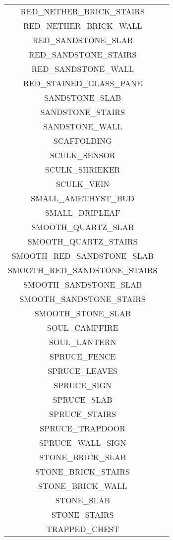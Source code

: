 \begin{longtable}{ |c|c| }
	RED\_NETHER\_BRICK\_STAIRS & \xmark \\
	RED\_NETHER\_BRICK\_WALL & \xmark \\
	RED\_SANDSTONE\_SLAB & \xmark \\
	RED\_SANDSTONE\_STAIRS & \xmark \\
	RED\_SANDSTONE\_WALL & \xmark \\
	RED\_STAINED\_GLASS\_PANE & \xmark \\
	SANDSTONE\_SLAB & \xmark \\
	SANDSTONE\_STAIRS & \xmark \\
	SANDSTONE\_WALL & \xmark \\
	SCAFFOLDING & \xmark \\
	SCULK\_SENSOR & \xmark \\
	SCULK\_SHRIEKER & \xmark \\
	SCULK\_VEIN & \xmark \\
	SMALL\_AMETHYST\_BUD & \xmark \\
	SMALL\_DRIPLEAF & \xmark \\
	SMOOTH\_QUARTZ\_SLAB & \xmark \\
	SMOOTH\_QUARTZ\_STAIRS & \xmark \\
	SMOOTH\_RED\_SANDSTONE\_SLAB & \xmark \\
	SMOOTH\_RED\_SANDSTONE\_STAIRS & \xmark \\
	SMOOTH\_SANDSTONE\_SLAB & \xmark \\
	SMOOTH\_SANDSTONE\_STAIRS & \xmark \\
	SMOOTH\_STONE\_SLAB & \xmark \\
	SOUL\_CAMPFIRE & \xmark \\
	SOUL\_LANTERN & \xmark \\
	SPRUCE\_FENCE & \xmark \\
	SPRUCE\_LEAVES & \xmark \\
	SPRUCE\_SIGN & \xmark \\
	SPRUCE\_SLAB & \xmark \\
	SPRUCE\_STAIRS & \xmark \\
	SPRUCE\_TRAPDOOR & \xmark \\
	SPRUCE\_WALL\_SIGN & \xmark \\
	STONE\_BRICK\_SLAB & \xmark \\
	STONE\_BRICK\_STAIRS & \xmark \\
	STONE\_BRICK\_WALL & \xmark \\
	STONE\_SLAB & \xmark \\
	STONE\_STAIRS & \xmark \\
	TRAPPED\_CHEST & \xmark \\

\end{longtable}
